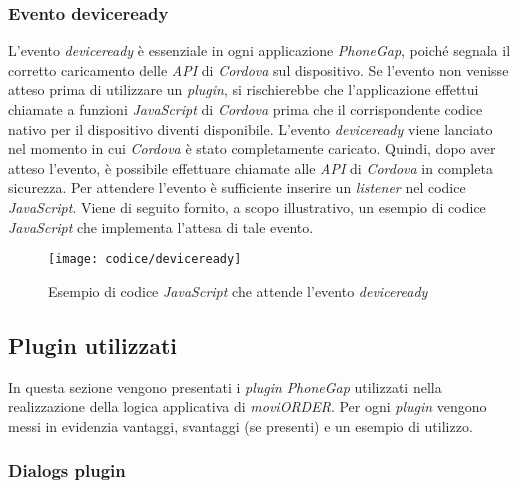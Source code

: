 \subsubsection{Evento deviceready}

L'evento \textit{deviceready} è essenziale in ogni applicazione \textit{PhoneGap}, poiché segnala il corretto caricamento delle \textit{API} di \textit{Cordova} sul dispositivo. Se l'evento non venisse atteso prima di utilizzare un \textit{plugin}, si rischierebbe che l'applicazione effettui chiamate a funzioni \textit{JavaScript} di \textit{Cordova} prima che il corrispondente codice nativo per il dispositivo diventi disponibile. L'evento \textit{deviceready} viene lanciato nel momento in cui \textit{Cordova} è stato completamente caricato. Quindi, dopo aver atteso l'evento, è possibile effettuare chiamate alle \textit{API} di \textit{Cordova} in completa sicurezza. Per attendere l'evento è sufficiente inserire un \textit{listener} nel codice \textit{JavaScript}. Viene di seguito fornito, a scopo illustrativo, un esempio di codice \textit{JavaScript} che implementa l'attesa di tale evento.

\begin{figure}[!h] 
    \centering 
    \texttt{[image: codice/deviceready]} 
    \caption{Esempio di codice \textit{JavaScript} che attende l'evento \textit{deviceready}}
\end{figure}

\subsection{Plugin utilizzati}

In questa sezione vengono presentati i \textit{plugin} \textit{PhoneGap} utilizzati nella realizzazione della logica applicativa di \textit{moviORDER}. Per ogni \textit{plugin} vengono messi in evidenzia vantaggi, svantaggi (se presenti) e un esempio di utilizzo.

\subsubsection{Dialogs plugin}

